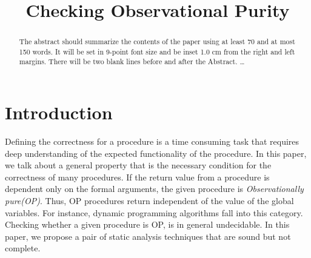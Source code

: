 \documentclass{llncs}
\begin{document}
\mainmatter              %
%
\title{Checking Observational Purity}
%
%

\maketitle              %

\begin{abstract}
The abstract should summarize the contents of the paper
using at least 70 and at most 150 words. It will be set in 9-point
font size and be inset 1.0 cm from the right and left margins.
There will be two blank lines before and after the Abstract. \dots
{}
\end{abstract}

\section{Introduction}
Defining the correctness for a procedure is a time consuming task that
requires deep understanding of the expected functionality of the
procedure. In this paper, we talk about a general property that is the
necessary condition for the correctness of many procedures. If the
return value from a procedure is dependent only on the formal
arguments, the given procedure is \textit{Observationally
  pure(OP)}. Thus, OP procedures return independent of the value of
the global variables. For instance, dynamic programming algorithms
fall into this category. Checking whether a given procedure is OP, is
in general undecidable. In this paper, we propose a pair of static
analysis techniques that are sound but not complete.
\end{document}
